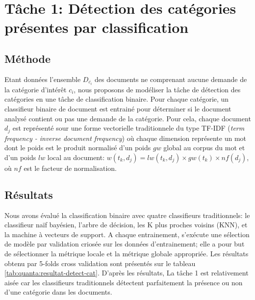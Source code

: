 \section{Tâche 1: Détection des catégories présentes par classification}
\subsection{Méthode}

Etant données l'ensemble $D_{\overline{c_i}}$ des documents ne comprenant aucune demande de la catégorie d'intérêt $c_i$, nous proposons de modéliser la tâche de détection des catégories en une tâche de classification binaire. Pour chaque catégorie, un classifieur binaire de document est entrainé pour déterminer si le document analysé contient ou pas une demande de la catégorie. Pour cela, chaque document $d_j$ est représenté sour une forme vectorielle traditionnele du type TF-IDF (\textit{term frequency - inverse document frequency}) où chaque dimension représente un mot dont le poids est le produit normalisé d'un poids $gw$ global au corpus du mot et d'un poids $lw$ local au document: $w(t_k, d_j) = lw(t_k, d_j) \times gw(t_k) \times nf(d_j)$, où $nf$ est le facteur de normalisation. 

\subsection{Résultats}

Nous avons évalué la classification binaire avec quatre classifieurs traditionnels: le classifieur naïf bayésien, l'arbre de décision, les K plus proches voisins (KNN), et la machine à vecteurs de support. A chaque entrainement, s'exécute une sélection de modèle par validation criosée sur les données d'entrainement; elle a pour but de sélectionner la métrique locale et la métrique globale appropriée. Les résultats obtenu par 5-folds cross validation sont présentés sur le tableau \ref{tab:quanta:resultat-detect-cat}.  D'après les résultats, La tâche 1 est relativement aisée car les classifieurs traditionnels détectent parfaitement la présence ou non d'une catégorie dans les documents.

